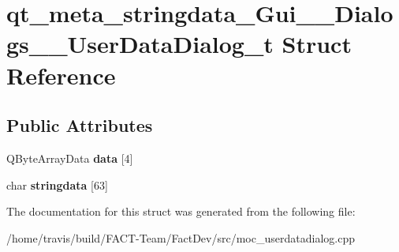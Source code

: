 \hypertarget{structqt__meta__stringdata__Gui____Dialogs____UserDataDialog__t}{\section{qt\-\_\-meta\-\_\-stringdata\-\_\-\-Gui\-\_\-\-\_\-\-Dialogs\-\_\-\-\_\-\-User\-Data\-Dialog\-\_\-t Struct Reference}
\label{structqt__meta__stringdata__Gui____Dialogs____UserDataDialog__t}
}
\subsection*{Public Attributes}
\begin{DoxyCompactItemize}
\item 
\hypertarget{structqt__meta__stringdata__Gui____Dialogs____UserDataDialog__t_a8bc1364d334b74ae5e42b5e2c68ba6fb}{Q\-Byte\-Array\-Data {\bfseries data} \mbox{[}4\mbox{]}}\label{structqt__meta__stringdata__Gui____Dialogs____UserDataDialog__t_a8bc1364d334b74ae5e42b5e2c68ba6fb}

\item 
\hypertarget{structqt__meta__stringdata__Gui____Dialogs____UserDataDialog__t_a21f576ed695662bdc0680bc8bec822c7}{char {\bfseries stringdata} \mbox{[}63\mbox{]}}\label{structqt__meta__stringdata__Gui____Dialogs____UserDataDialog__t_a21f576ed695662bdc0680bc8bec822c7}

\end{DoxyCompactItemize}


The documentation for this struct was generated from the following file\-:\begin{DoxyCompactItemize}
\item 
/home/travis/build/\-F\-A\-C\-T-\/\-Team/\-Fact\-Dev/src/moc\-\_\-userdatadialog.\-cpp\end{DoxyCompactItemize}
